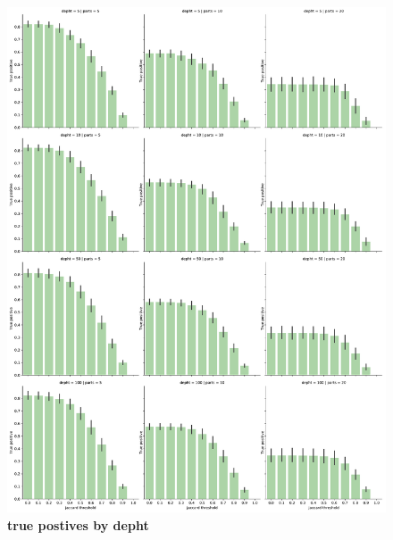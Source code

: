 \documentclass[11pt, a4paper]{article}
\begin{document}
\begin{figure}[ht]
    \begin{center}
    \includegraphics[width=1\textwidth]{../results/images_notebook/v_312/true_positive.pdf}
    \end{center}
    \caption{{\bf true postives by depht }}
   \label{fig:v_312_true_positive.}
\end{figure}
\end{document}
